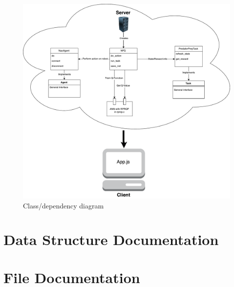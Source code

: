 \documentclass[twoside]{article}
\newcommand{\+}{\discretionary{\mbox{\scriptsize$\hookleftarrow$}}{}{}}
\begin{document}
\hypersetup{pageanchor=false,
             bookmarks=true,
             bookmarksnumbered=true,
             pdfencoding=unicode
            }
\begin{titlepage}
\end{titlepage}
\tableofcontents
{}
\hypersetup{pageanchor=true}
\pagebreak
\vspace*{5em}
\begin{center}%
	\begin{figure}[ht!]
		\centering
		\includegraphics[width=1.0\textwidth]{nfq.pdf}
		\caption{Class/dependency diagram}\label{f:1}
	\end{figure}
\end{center}
\pagebreak
\section{Data Structure Documentation}








\section{File Documentation}




\newpage
{}
{}
\printindex
\end{document}
